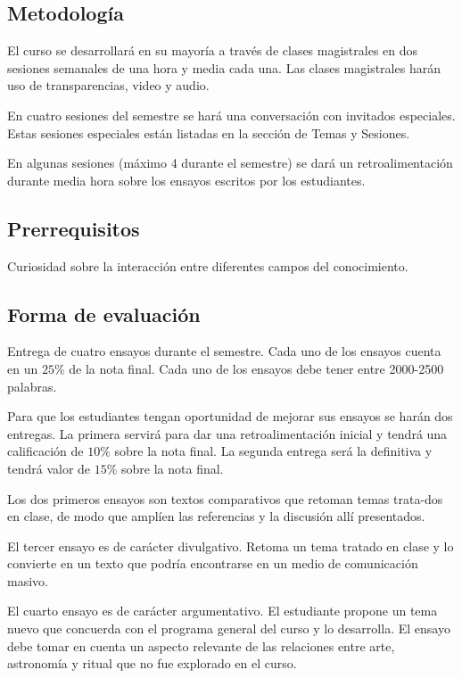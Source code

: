 \documentclass{report}
\begin{document}
\subsection*{Metodolog\'ia}

El curso se desarrollar\'a en su mayor\'ia a trav\'es de clases
magistrales en dos sesiones semanales de una hora y media cada
una. Las clases magistrales har\'an uso de transparencias, video y
audio. 

En cuatro sesiones del semestre se har\'a una conversaci\'on con
invitados especiales. Estas sesiones especiales est\'an listadas en la
secci\'on de Temas y Sesiones.  

En algunas sesiones (m\'aximo 4 durante el semestre) se dar\'a un
retroalimentaci\'on durante media hora sobre los ensayos escritos por los
estudiantes. 

\subsection*{Prerrequisitos}
Curiosidad sobre la interacci\'on entre diferentes campos del
conocimiento.


\subsection*{Forma de evaluaci\'on}

Entrega de cuatro ensayos durante el semestre. Cada uno de los ensayos
cuenta en un $25 \%$ de la nota final. Cada uno de los ensayos debe
tener entre 2000-2500 palabras.  

Para que los estudiantes tengan oportunidad de mejorar sus ensayos se
har\'an dos entregas. La primera servir\'a para dar una
retroalimentaci\'on inicial y tendr\'a una calificaci\'on de $10\%$
sobre la nota final. La segunda entrega ser\'a la definitiva y
tendr\'a  valor de $15\%$ sobre la nota final. 
 
Los dos primeros ensayos son textos comparativos que retoman temas
trata-dos en clase, de modo que ampl\'ien las referencias y la
discusi\'on all\'i presentados.

El tercer ensayo es de car\'acter divulgativo. Retoma un tema
tratado en clase y lo convierte en un texto que podr\'ia encontrarse
en un medio de comunicaci\'on masivo.  

El cuarto ensayo es de car\'acter argumentativo. El estudiante propone
un tema nuevo que concuerda con el programa general del curso y lo
desarrolla. El ensayo debe tomar en cuenta un aspecto
relevante de las relaciones entre arte, astronom\'ia y ritual que
no fue explorado en el curso. 
\end{document}

